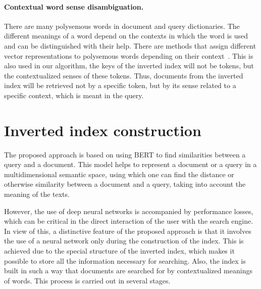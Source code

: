 \documentclass[
    twocolumn,
]{template/ceurart}
\begin{document}
    \paragraph{Contextual word sense disambiguation.}
    There are many polysemous words in document and query dictionaries.
    The different meanings of a word depend on the contexts in which the word is used and
    can be distinguished with their help.
    There are methods that assign different vector representations
    to polysemous words depending on their context~\cite{athiwaratkun2018probabilistic}.
    This is also used in our algorithm, the keys of the inverted index will not be tokens,
    but the contextualized senses of these tokens.
    Thus, documents from the inverted index will be retrieved not by a specific token,
    but by its sense related to a specific context, which is meant in the query.


    \section{Inverted index construction}
    The proposed approach is based on using BERT to find similarities between a query and a document.
    This model helps to represent a document or a query in a multidimensional semantic space,
    using which one can find the distance or otherwise similarity between a document and a query,
    taking into account the meaning of the texts.

    However, the use of deep neural networks is accompanied by performance losses,
    which can be critical in the direct interaction of the user with the search engine.
    In view of this, a distinctive feature of the proposed approach is that it involves the use of a neural network
    only during the construction of the index.
    This is achieved due to the special structure of the inverted index,
    which makes it possible to store all the information necessary for searching.
    Also, the index is built in such a way that documents are searched for by contextualized meanings of words.
    This process is carried out in several stages.
\end{document}
